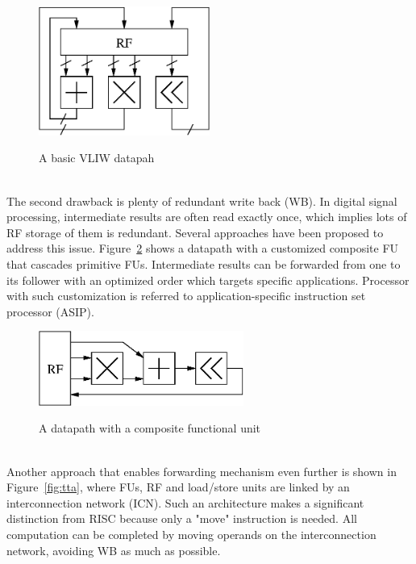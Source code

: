 \documentclass[12pt]{article}
\begin{document}
\begin{CJK}{UTF8}{bkai}
        \begin{figure}[!ht] 
            \caption{A basic VLIW datapah}
            \centering
            \includegraphics[width=0.5\textwidth]{./figs/vliw.eps}
            \label{fig:vliw}
        \end{figure}
        \\\indent
        The second drawback is plenty of redundant write back (WB). 
        In digital signal processing, intermediate results are often read exactly once, which implies lots of RF storage of them is redundant.
        Several approaches have been proposed to address this issue.
        Figure~\ref{fig:cascade} shows a datapath with a customized composite FU that cascades primitive FUs. 
        Intermediate results can be forwarded from one to its follower with an optimized order which targets specific applications.
        Processor with such customization is referred to application-specific instruction set processor (ASIP).
        \begin{figure}[!ht] 
            \caption{A datapath with a composite functional unit}
            \centering
            \includegraphics[width=0.6\textwidth]{./figs/cascade.eps}
            \label{fig:cascade}
        \end{figure}
        \\\indent
        Another approach that enables forwarding mechanism even further is shown in Figure~\ref{fig:tta}, where FUs, RF and load/store units are linked by an interconnection network (ICN).
        Such an architecture makes a significant distinction from RISC because only a "move" instruction is needed. 
        All computation can be completed by moving operands on the interconnection network, avoiding WB as much as possible.


\end{CJK}
\end{document}
